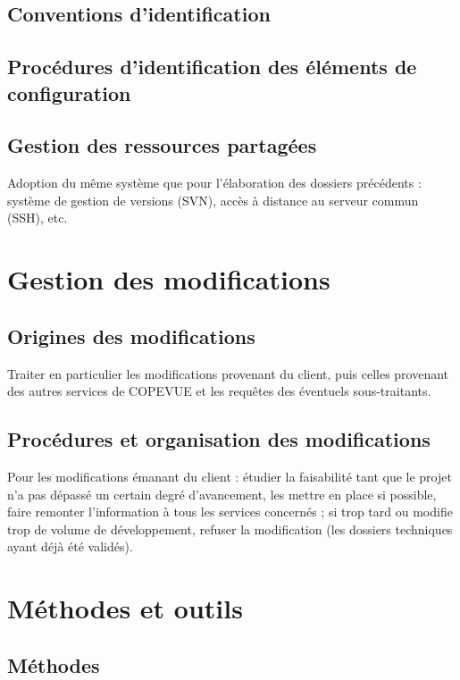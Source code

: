\section{Conventions d'identification}

\section{Procédures d'identification des éléments de configuration}

\section{Gestion des ressources partagées}

Adoption du même système que pour l'élaboration des dossiers précédents : système de gestion de versions (SVN), accès à distance au serveur commun (SSH), etc.

\chapter{Gestion des modifications}

\label{chapter:mods}

\section{Origines des modifications}

Traiter en particulier les modifications provenant du client, puis celles provenant des autres services de COPEVUE et les requêtes des éventuels sous-traitants.

\section{Procédures et organisation des modifications}

Pour les modifications émanant du client : étudier la faisabilité tant que le projet n'a pas dépassé un certain degré d'avancement, les mettre en place si possible, faire remonter l'information à tous les services concernés ; si trop tard ou modifie trop de volume de développement, refuser la modification (les dossiers techniques ayant déjà été validés).

\chapter{Méthodes et outils}

\section{Méthodes}


